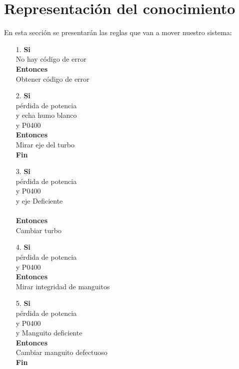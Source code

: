 \documentclass[a4paper,12pt]{article}
\newcommand\tab[1][1cm]{\hspace*{#1}}
\begin{document}
\section{Representación del conocimiento}
En esta sección se presentarán las reglas que van a mover nuestro sistema:

\begin{itemize}
\item[1.]\textbf{Si}\\ \tab No hay código de error\\\textbf{Entonces}\\ \tab Obtener código de error
\item[2.]\textbf{Si}\\ \tab pérdida de potencia\\ \tab y echa humo blanco\\ \tab y P0400\\ \textbf{Entonces}\\ \tab Mirar eje del turbo\\ \tab \textbf{Fin}
\item[3.]\textbf{Si}\\ \tab pérdida de potencia\\ \tab y P0400\\ \tab y eje Deficiente\\ \\\textbf{Entonces}\\ \tab Cambiar turbo
\item[4.]\textbf{Si}\\ \tab pérdida de potencia\\ \tab y P0400\\ \textbf{Entonces}\\ \tab Mirar integridad de manguitos
\item[5.]\textbf{Si}\\ \tab pérdida de potencia\\ \tab y P0400\\ \tab y Manguito deficiente\\ \textbf{Entonces}\\ \tab Cambiar manguito defectuoso\\ \tab \textbf{Fin}

\end{itemize}
\end{document}
